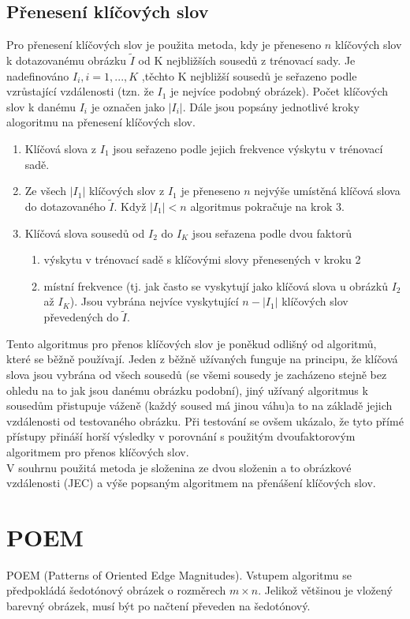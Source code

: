 \documentclass[czech,BP]{thesiskiv}
\begin{document}
\section{Přenesení klíčových slov}
Pro přenesení klíčových slov je použita metoda, kdy je přeneseno $n$ klíčových slov k dotazovanému obrázku $\tilde{I}$ od K nejbližších sousedů z trénovací sady. Je nadefinováno $I_{i}, i = 1, ..., K$ ,těchto K nejbližší sousedů je seřazeno podle vzrůstající vzdálenosti (tzn. že $I_{1} $ je nejvíce podobný obrázek). Počet klíčových slov k danému $I_{i}$ je označen jako $|I_{i}|$. Dále jsou popsány jednotlivé kroky alogoritmu na přenesení klíčových slov.
\begin{enumerate}
	\item Klíčová slova z $I_{1}$ jsou seřazeno podle jejich frekvence výskytu v trénovací sadě.
	\item Ze všech $|I_{1}|$ klíčových slov z $I_{1}$ je přeneseno $n$ nejvýše umístěná klíčová slova do dotazovaného $\tilde{I}$. Když $|I_{1}| < n$ algoritmus pokračuje na krok 3. 
	\item Klíčová slova sousedů od $I_{2}$ do $I_{K}$ jsou seřazena podle dvou faktorů
	\begin{enumerate}
		\item výskytu v trénovací sadě s klíčovými slovy přenesených v kroku 2
		\item místní frekvence (tj. jak často se vyskytují jako klíčová slova u obrázků $I_{2}$ až $I_{K}$). Jsou vybrána nejvíce vyskytující $n-|I_{1}|$ klíčových slov převedených do $\tilde{I}$.
	\end{enumerate}
\end{enumerate}

Tento algoritmus pro přenos klíčových slov je poněkud odlišný od algoritmů, které se běžně používají. Jeden z běžně užívaných funguje na principu, že klíčová slova jsou vybrána od všech sousedů (se všemi sousedy je zacházeno stejně bez ohledu na to jak jsou danému obrázku podobní), jiný užívaný algoritmus k sousedům přistupuje váženě (každý soused má jinou váhu)a to na základě jejich vzdálenosti od testovaného obrázku. Při testování se ovšem ukázalo, že tyto přímé přístupy přináší horší výsledky v porovnání s použitým dvoufaktorovým algoritmem pro přenos klíčových slov. \\
V souhrnu použitá metoda je složenina ze dvou složenin a to obrázkové vzdálenosti (JEC) a výše popsaným algoritmem na přenášení klíčových slov. 
 
\chapter{POEM}
POEM (Patterns of Oriented Edge Magnitudes). Vstupem algoritmu se předpokládá šedotónový obrázek o rozměrech  $m \times n$. Jelikož většinou je vložený barevný obrázek, musí být po načtení převeden na šedotónový. \cite{SrovnaniDeskriptoru}
\end{document}
